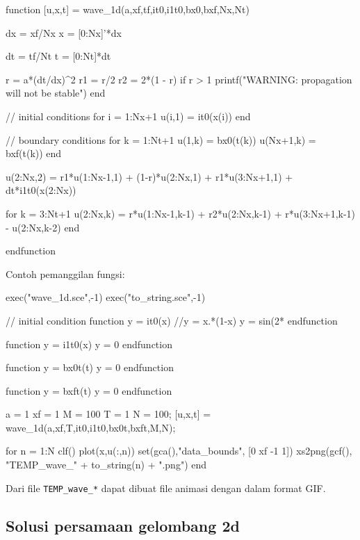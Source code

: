 \documentclass[10pt,bahasa]{article}
\begin{document}
\begin{scilabcode}
function [u,x,t] = wave_1d(a,xf,tf,it0,i1t0,bx0,bxf,Nx,Nt)

  dx = xf/Nx
  x = [0:Nx]'*dx
  
  dt = tf/Nt
  t = [0:Nt]*dt
  
  r = a*(dt/dx)^2
  r1 = r/2
  r2 = 2*(1 - r)
  if r > 1
    printf("WARNING: propagation will not be stable\n\n")
  end

  // initial conditions
  for i = 1:Nx+1
    u(i,1) = it0(x(i))
  end

  // boundary conditions
  for k = 1:Nt+1
    u(1,k)    = bx0(t(k))
    u(Nx+1,k) = bxf(t(k))
  end

  u(2:Nx,2) = r1*u(1:Nx-1,1) + (1-r)*u(2:Nx,1) + r1*u(3:Nx+1,1) + dt*i1t0(x(2:Nx))
  
  for k = 3:Nt+1
    u(2:Nx,k) = r*u(1:Nx-1,k-1) + r2*u(2:Nx,k-1) + r*u(3:Nx+1,k-1) - u(2:Nx,k-2)
  end

endfunction
\end{scilabcode}

Contoh pemanggilan fungsi:

\begin{scilabcode}
exec("wave_1d.sce",-1)
exec("to_string.sce",-1)

// initial condition
function y = it0(x)
  //y = x.*(1-x)
  y = sin(2*%
endfunction

function y = i1t0(x)
  y = 0
endfunction

function y = bx0t(t)
  y = 0
endfunction

function y = bxft(t)
  y = 0
endfunction

a = 1
xf = 1
M = 100
T = 1
N = 100;
[u,x,t] = wave_1d(a,xf,T,it0,i1t0,bx0t,bxft,M,N);

for n = 1:N
  clf()
  plot(x,u(:,n))
  set(gca(),"data_bounds", [0 xf -1 1])
  xs2png(gcf(), "TEMP_wave_" + to_string(n) + ".png")
end
\end{scilabcode}

Dari file \verb|TEMP_wave_*| dapat dibuat file animasi dengan dalam format GIF.

\subsection*{Solusi persamaan gelombang 2d}
\end{document}
